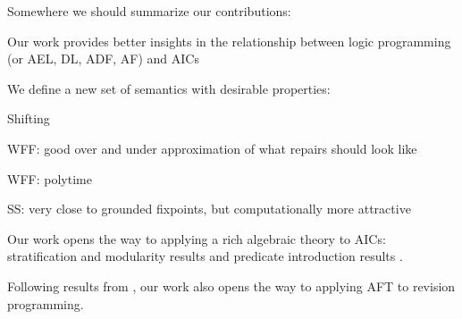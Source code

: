 Somewhere we should summarize our contributions:
\begin{compactitem}
 \item Our work provides better insights in the relationship between logic programming (or AEL, DL, ADF, AF) and AICs
\item We define a new set of semantics with desirable properties:
\begin{compactitem}
\item  Shifting
 \item WFF: good over and under approximation of what repairs should look like
 \item WFF: polytime
 \item SS: very close to grounded fixpoints, but computationally more attractive
\end{compactitem}
\item Our work opens the way to applying a rich algebraic theory to AICs: stratification and modularity results \cite{tocl/VennekensGD06,tocl/BogaertsVD16} and predicate introduction results \cite{VennekensMWD07a,VennekensMWD07b}. 
\item Following results from \citet{tplp/CaropreseT11}, our work also opens the way to applying AFT to revision programming. 
\end{compactitem}
 